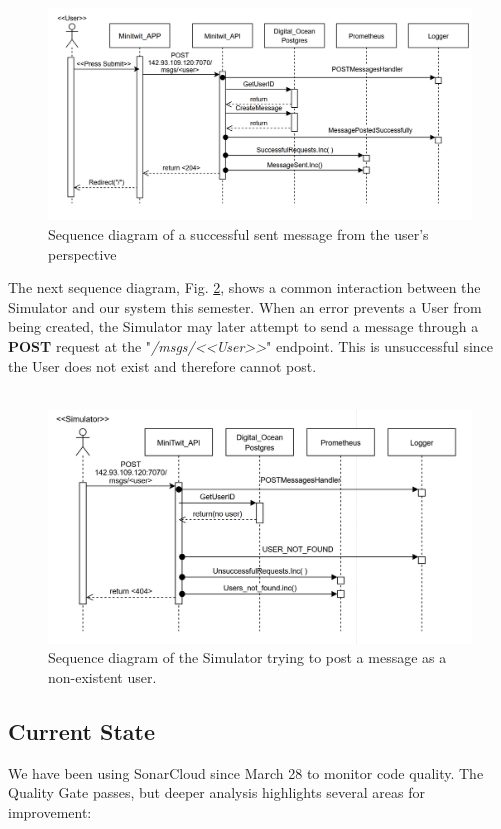 \begin{figure}[!htb]
    \centering
    \includegraphics[width=0.9\linewidth]{Images/seq_user.png}
    \caption{Sequence diagram of a successful sent message from the user's perspective}
    \label{fig:seq_user}
\end{figure}

The next sequence diagram, Fig. \ref{fig:seq_fail}, shows a common interaction between the Simulator and our system this semester. When an error prevents a User from being created, the Simulator may later attempt to send a message through a \textbf{POST} request at the "\textit{/msgs/<<User>>}" endpoint. This is unsuccessful since the User does not exist and therefore cannot post.\\ \\ 

\begin{figure} [!htb]
    \centering
    \includegraphics[width=0.9\linewidth]{Images/Seq_fail.png}
    \caption{Sequence diagram of the Simulator trying to post a message as a non-existent user.}
    \label{fig:seq_fail}
\end{figure}
\newpage
\subsection{Current State}
We have been using SonarCloud since March 28 to monitor code quality. The Quality Gate passes, but deeper analysis highlights several areas for improvement:

